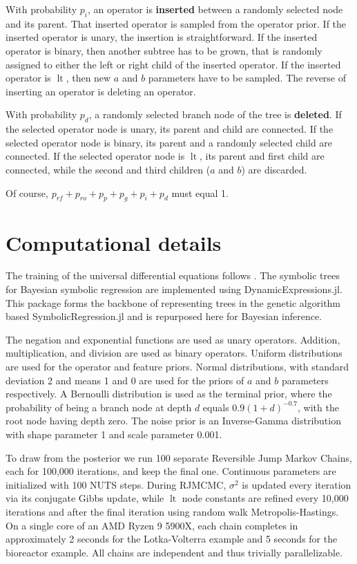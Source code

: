 \documentclass{ifacconf}
\DeclareMathOperator{\lt}{lt}
\begin{document}
	With probability $p_i$, an operator is \textbf{inserted} between a randomly selected node and its parent.
	That inserted operator is sampled from the operator prior.
	If the inserted operator is unary, the insertion is straightforward.
	If the inserted operator is binary, then another subtree has to be grown,
	that is randomly assigned to either the left or right child of the inserted operator.
	If the inserted operator is $\lt$, then new $a$ and $b$ parameters have to be sampled.
	The reverse of inserting an operator is deleting an operator.
	
	With probability $p_d$, a randomly selected branch node of the tree is \textbf{deleted}.
	If the selected operator node is unary, its parent and child are connected.
	If the selected operator node is binary, its parent and a randomly selected child are connected.
	If the selected operator node is $\lt$, its parent and first child are connected,
	while the second and third children ($a$ and $b$) are discarded.
	
	Of course, $p_{rf} + p_{ro} + p_p + p_g + p_i + p_d$ must equal 1. 
	\section{Computational details}
	The training of the universal differential equations follows \citet{strouwen}.
	The symbolic trees for Bayesian symbolic regression are implemented using DynamicExpressions.jl.
	This package forms the backbone of representing trees in the genetic algorithm based SymbolicRegression.jl \citep{cranmerInterpretableMachineLearning2023} and is repurposed here for Bayesian inference.
	
	The negation and exponential functions are used as unary operators.
	Addition, multiplication, and division are used as binary operators.
	Uniform distributions are used for the operator and feature priors.
	Normal distributions, with standard deviation 2 and means 1 and 0 are used for the priors of $a$ and $b$ parameters respectively.
	A Bernoulli distribution is used as the terminal prior,
	where the probability of being a branch node at depth $d$ equals $0.9(1 + d)^{-0.7}$,
	with the root node having depth zero.
	The noise prior is an Inverse-Gamma distribution with shape parameter 1 and scale parameter 0.001.
	
	To draw from the posterior we run 100 separate Reversible Jump Markov Chains,
	each for 100,000 iterations, and keep the final one.
	Continuous parameters are initialized with 100 NUTS \citep{hoffman} steps.
	During RJMCMC, $\sigma^2$ is updated every iteration via its conjugate Gibbs update, while $\lt$ node constants are refined every 10,000 iterations and after the final iteration using random walk Metropolis-Hastings.
	On a single core of an AMD Ryzen 9 5900X, each chain completes in approximately 2 seconds for the Lotka-Volterra example and 5 seconds for the bioreactor example.
	All chains are independent and thus trivially parallelizable.
\end{document}
